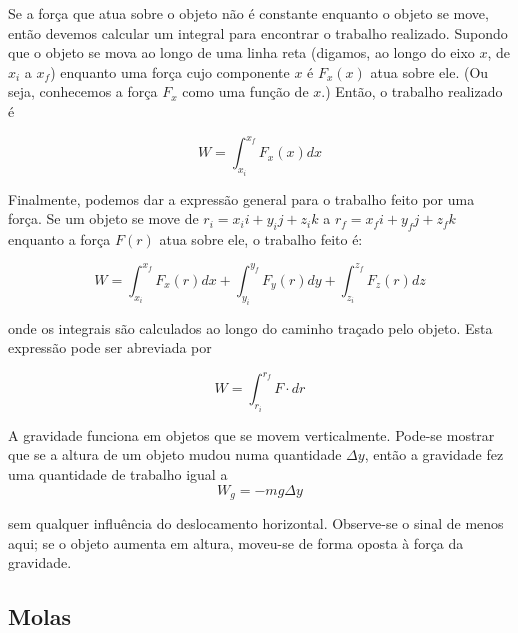 Se a força que atua sobre o objeto não é constante enquanto o objeto se move, então devemos calcular um integral para encontrar o trabalho realizado.
Supondo que o objeto se mova ao longo de uma linha reta (digamos, ao longo do eixo $x$, de $x_i$ a $x_f$) enquanto
uma força cujo componente $x$ é $F_x(x)$ atua sobre ele. (Ou seja, conhecemos a força $F_x$ como uma função
de $x$.) Então, o trabalho realizado é

$$
\begin{equation}
    W=\int_{x_i}^{x_f}F_x(x)dx
\end{equation}
$$

Finalmente, podemos dar a expressão general para o trabalho feito por uma força. Se um objeto se move de $r_i=x_ii+y_ij+z_ik$ a $r_f=x_fi+y_fj+z_fk$ enquanto a força $F(r)$ atua sobre ele, o trabalho feito é:

$$
    \begin{equation}
        W=\int_{x_i}^{x_f}F_x(r)dx+\int_{y_i}^{y_f}F_y(r)dy+\int_{z_i}^{z_f}F_z(r)dz
    \end{equation}
$$

onde os integrais são calculados ao longo do caminho traçado pelo objeto. Esta expressão pode ser abreviada por

$$
W=\int_{r_i}^{r_f}F\cdot dr
$$

A gravidade funciona em objetos que se movem verticalmente. Pode-se mostrar que se a altura de um objeto mudou numa quantidade $\Delta y$, então a gravidade fez uma quantidade de trabalho igual a 
$$
W_{g}=-mg\Delta y
$$

sem qualquer influência do deslocamento horizontal. Observe-se o sinal de menos aqui; se o objeto aumenta em altura, moveu-se de forma oposta à força da gravidade.

\subsection{Molas}